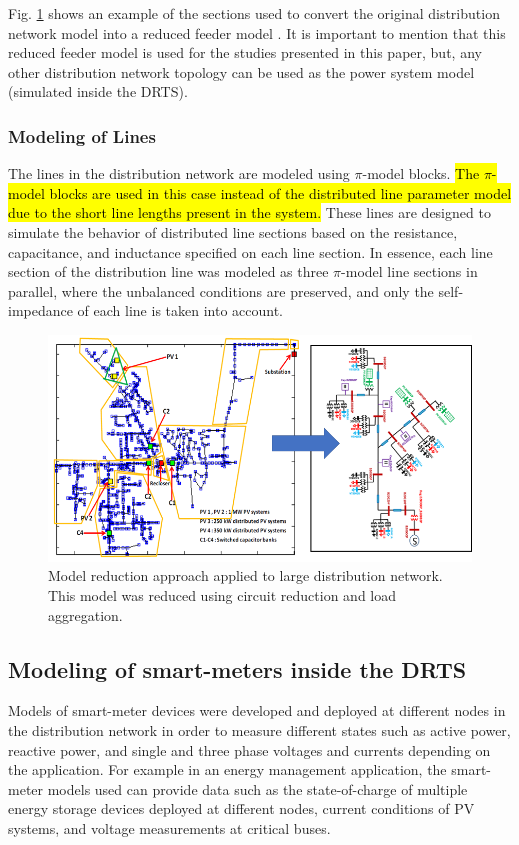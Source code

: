 Fig. \ref{fig:modelreduction} shows an example of the sections used to convert the original distribution network model into a reduced feeder model \cite{sungrin}. It is important to mention that this reduced feeder model is used for the studies presented in this paper, but, any other distribution network topology can be used as the power system model (simulated inside the DRTS).

\subsubsection{Modeling of Lines} The lines in the distribution network are modeled using $\pi$-model blocks. \hl{The $\pi$-model blocks are used in this case instead of the distributed line parameter model due to the short line lengths present in the system.} These lines are designed to simulate the behavior of distributed line sections based on the resistance, capacitance, and inductance specified on each line section. In essence, each line section of the distribution line was modeled as three $\pi$-model line sections in parallel, where the unbalanced conditions are preserved, and only the self-impedance of each line is taken into account. 

\begin{figure}[!ht]
    \centering
    \includegraphics[width = 0.7\linewidth]{figs/model_reduction.png}
    \caption{Model reduction approach applied to large distribution network. This model was reduced using circuit reduction and load aggregation.}
    \label{fig:modelreduction}
\end{figure}
\vspace{-5mm}
\subsection{Modeling of smart-meters inside the DRTS}
Models of smart-meter devices were developed and deployed at different nodes in the distribution network in order to measure different states such as active power, reactive power, and single and three phase voltages and currents depending on the application. For example in an energy management application, the smart-meter models used can provide data such as the state-of-charge of multiple energy storage devices deployed at different nodes, current conditions of PV systems, and voltage measurements at critical buses.

